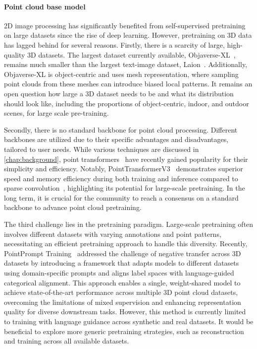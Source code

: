 \paragraph{Point cloud base model}
2D image processing has significantly benefited from self-supervised pretraining on large datasets since the rise of deep learning. However, pretraining on 3D data has lagged behind for several reasons. Firstly, there is a scarcity of large, high-quality 3D datasets. The largest dataset currently available, Objaverse-XL~\cite{deitke2024objaverse}, remains much smaller than the largest text-image dataset, Laion~\cite{schuhmann2022laion}. Additionally, Objaverse-XL is object-centric and uses mesh representation, where sampling point clouds from these meshes can introduce biased local patterns. It remains an open question how large a 3D dataset needs to be and what its distribution should look like, including the proportions of object-centric, indoor, and outdoor scenes, for large scale pre-training. 

Secondly, there is no standard backbone for point cloud processing. Different backbones are utilized due to their specific advantages and disadvantages, tailored to user needs. While various techniques are discussed in \cref{chap:background}, point transformers~\cite{zhao2021point,wu2022point,wu2024point} have recently gained popularity for their simplicity and efficiency. Notably, PointTransformerV3~\cite{wu2024point} demonstrates superior speed and memory efficiency during both training and inference compared to sparse convolution~\cite{choy2019Minkowski}, highlighting its potential for large-scale pretraining. In the long term, it is crucial for the community to reach a consensus on a standard backbone to advance point cloud pretraining.

The third challenge lies in the pretraining paradigm. Large-scale pretraining often involves different datasets with varying annotations and point patterns, necessitating an efficient pretraining approach to handle this diversity. Recently, PointPrompt Training~\cite{wu2024towards} addressed the challenge of negative transfer across 3D datasets by introducing a framework that adapts models to different datasets using domain-specific prompts and aligns label spaces with language-guided categorical alignment. This approach enables a single, weight-shared model to achieve state-of-the-art performance across multiple 3D point cloud datasets, overcoming the limitations of mixed supervision and enhancing representation quality for diverse downstream tasks. However, this method is currently limited to training with language guidance across synthetic and real datasets. It would be beneficial to explore more generic pretraining strategies, such as reconstruction~\cite{xiao2013sun3d} and training across all available datasets.


